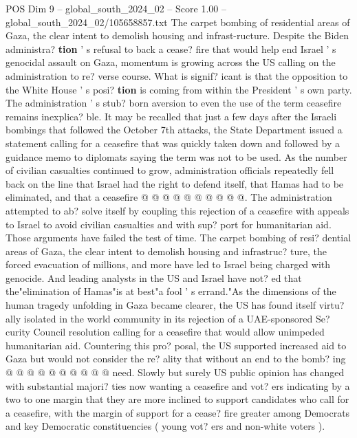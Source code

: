 \begin{textsample}{POS Dim 9 – global\_south\_2024\_02 – Score 1.00 – global\_south\_2024\_02/105658857.txt}  \label{ex:f9_pos_098}
The carpet bombing of residential areas of Gaza, the clear intent to demolish housing and infrast-ructure.
Despite the Biden administra? \textbf{tion} ' s refusal to back a cease? fire that would help end Israel ' s genocidal assault on Gaza, momentum is growing across the US calling on the administration to re? verse course.
What is signif? icant is that the opposition to the White House ' s posi? \textbf{tion} is coming from within the President ' s own party.
The administration ' s stub? born aversion to even the use of the term ceasefire remains inexplica? ble.
It may be recalled that just a few days after the Israeli bombings that followed the October 7th attacks, the State Department issued a statement calling for a ceasefire that was quickly taken down and followed by a guidance memo to diplomats saying the term was not to be used.
As the number of civilian casualties continued to grow, administration officials repeatedly fell back on the line that Israel had the right to defend itself, that Hamas had to be eliminated, and that a ceasefire @ @ @ @ @ @ @ @ @ @.
The administration attempted to ab? solve itself by coupling this rejection of a ceasefire with appeals to Israel to avoid civilian casualties and with sup? port for humanitarian aid.
Those arguments have failed the test of time.
The carpet bombing of resi? dential areas of Gaza, the clear intent to demolish housing and infrastruc? ture, the forced evacuation of millions, and more have led to Israel being charged with genocide.
And leading analysts in the US and Israel have not? ed that the"elimination of Hamas"is at best"a fool ' s errand."As the dimensions of the human tragedy unfolding in Gaza became clearer, the US has found itself virtu? ally isolated in the world community in its rejection of a UAE-sponsored Se? curity Council resolution calling for a ceasefire that would allow unimpeded humanitarian aid.
Countering this pro? posal, the US supported increased aid to Gaza but would not consider the re? ality that without an end to the bomb? ing @ @ @ @ @ @ @ @ @ @ need.
Slowly but surely US public opinion has changed with substantial majori? ties now wanting a ceasefire and vot? ers indicating by a two to one margin that they are more inclined to support candidates who call for a ceasefire, with the margin of support for a cease? fire greater among Democrats and key Democratic constituencies ( young vot? ers and non-white voters ).

\end{textsample}
